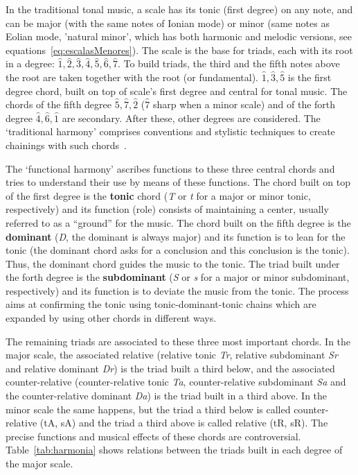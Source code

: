 In the traditional tonal music, a scale has its tonic (first
degree) on any note, and can be major (with the same notes of Ionian mode) or minor (same notes as Eolian mode, 'natural minor', which has both harmonic and melodic versions, see equations~\ref{eq:escalasMenores}). The
scale is the base for triads, each with its root in a degree: $\hat{1},\hat{2},\hat{3},\hat{4},\hat{5},\hat{6},\hat{7}$. 
To build triads, the third and the fifth notes above the root are taken together with the root (or fundamental).
$\hat{1},\hat{3},\hat{5}$ is the first degree chord,
 built on top of scale's first degree and central for tonal music. The chords of the fifth degree $\hat{5},\hat{7},\hat{2}$ ($\hat{7}$ sharp when a minor scale) and of the forth degree $\hat{4},\hat{6},\hat{1}$ are secondary. After these, other degrees are considered. The `traditional harmony' comprises conventions and stylistic techniques to create chainings with such chords~\cite{Harmonia}. 

The `functional harmony' ascribes functions to these three central chords and tries to understand their use by means of these functions. The chord built on top of the first degree is the \textbf{tonic} chord (\textit{T} or \textit{t} for a major or minor tonic, respectively) and its function (role) consists of maintaining a center, usually referred to as a ``ground'' for the music. The chord built on the fifth degree is the \textbf{dominant} (\textit{D}, the dominant is always major) and its function is to lean for the tonic
(the dominant chord asks for a conclusion and this conclusion is the tonic). Thus, the dominant chord guides the music to the tonic. The triad built under the forth degree is the \textbf{subdominant} (\textit{S} or \textit{s} for a major or minor
subdominant, respectively) and its function is to deviate the music from the tonic. The process aims at confirming the tonic using tonic-dominant-tonic chains which are expanded by using other chords in different ways.

The remaining triads are associated to these three most important chords. In the major scale, the associated relative (relative tonic \textit{Tr}, relative
subdominant \textit{Sr} and relative dominant \textit{Dr}) is the triad built a third below, and the associated counter-relative (counter-relative tonic \textit{Ta}, counter-relative subdominant \textit{Sa} and the counter-relative dominant \textit{Da}) is the triad built in a third above. In the minor scale the same happens, but the triad a third below is called counter-relative (tA, sA) and the triad a third above is called relative (tR,
sR). The precise functions and musical effects of these chords are
controversial. Table~\ref{tab:harmonia} shows relations between the triads built in each degree of the major scale.

